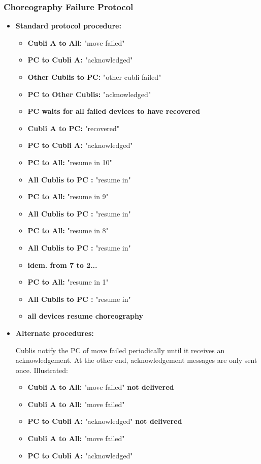 \subsubsection{Choreography Failure Protocol}

\begin{itemize}
\item[] \textbf{Standard protocol procedure:}

\begin{itemize}
\item[] \textbf{Cubli A      to All:} "move failed"
\item[] \textbf{PC       to Cubli A:} "acknowledged"
\item[] \textbf{Other Cublis  to PC:} "other cubli failed"
\item[] \textbf{PC  to Other Cublis:} "acknowledged"
\item[] \textbf{PC waits for all failed devices to have recovered}
\item[] \textbf{Cubli A       to PC:} "recovered"
\item[] \textbf{PC       to Cubli A:} "acknowledged"
\item[] \textbf{PC           to All:} "resume in 10"
\item[] \textbf{All Cublis   to PC :} "resume in"
\item[] \textbf{PC           to All:} "resume in  9"
\item[] \textbf{All Cublis   to PC :} "resume in"
\item[] \textbf{PC           to All:} "resume in  8"
\item[] \textbf{All Cublis   to PC :} "resume in"
\item[] \textbf{idem. from 7 to 2...}
\item[] \textbf{PC           to All:} "resume in  1"
\item[] \textbf{All Cublis   to PC :} "resume in"
\item[] \textbf{all devices resume choreography}
\end{itemize}

\item[] \textbf{Alternate procedures:}

Cublis notify the PC of move failed periodically until it receives an acknowledgement. At the other end, acknowledgement messages are only sent once. Illustrated:

\begin{itemize}
\item[] \textbf{Cubli A      to All:} "move failed" \textbf{not delivered}
\item[] \textbf{Cubli A      to All:} "move failed"
\item[] \textbf{PC       to Cubli A:} "acknowledged" \textbf{not delivered}
\item[] \textbf{Cubli A      to All:} "move failed"
\item[] \textbf{PC       to Cubli A:} "acknowledged"
\end {itemize}


\end{itemize}
